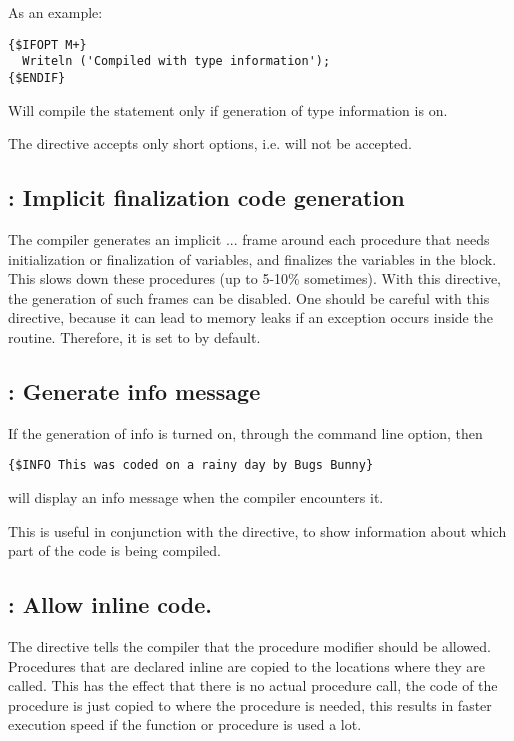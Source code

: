 As an example:
\begin{verbatim}
{$IFOPT M+}
  Writeln ('Compiled with type information');
{$ENDIF}
\end{verbatim}
Will compile the  statement only if generation of type information is on.

\begin{remark}The  directive accepts only short options,
i.e.  will not be accepted.
\end{remark}

\subsection{ : Implicit finalization code
generation}

The compiler generates an implicit ... frame around
each procedure that needs initialization or finalization of variables, and
finalizes the variables in the  block. This
slows down these procedures (up to 5-10\% sometimes). 
With this directive, the generation of such frames can be disabled. 
One should be careful with this directive, because it can lead to memory 
leaks if an exception occurs inside the routine. 
Therefore, it is set to  by default.

\subsection{ : Generate info message}

If the generation of info is turned on, through the  command line
option, then
\begin{verbatim}
{$INFO This was coded on a rainy day by Bugs Bunny}
\end{verbatim}
will display an info message when the compiler encounters it.

This is useful in conjunction with the  directive, to show
information about which part of the code is being compiled.

\subsection{ : Allow inline code.}

The  directive tells the compiler that the 
procedure modifier should be allowed. Procedures that are declared inline
are copied to the locations where they are called. This has the effect that
there is no actual procedure call, the code of the procedure is just copied
to where the procedure is needed, this results in faster execution speed if
the function or procedure is used a lot.

